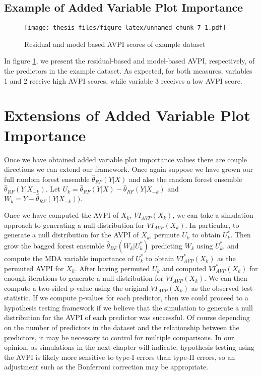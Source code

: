 \documentclass[12pt,twoside]{reedthesis}
\theoremstyle{definition}
\theoremstyle{definition}
\theoremstyle{definition}
\theoremstyle{remark}
\begin{document}
\subsection{Example of Added Variable Plot
Importance}\label{example-of-added-variable-plot-importance}
\begin{figure}
\centering
\texttt{[image: thesis\_files/figure-latex/unnamed-chunk-7-1.pdf]}
\caption{\label{fig:unnamed-chunk-7}\label{AVPIex}Residual and model based
AVPI scores of example dataset}
\end{figure}
In figure \ref{AVPIex}, we present the residual-based and model-based
AVPI, respectively, of the predictors in the example dataset. As
expected, for both measures, variables 1 and 2 receive high AVPI scores,
while variable 3 receives a low AVPI score.

\section{Extensions of Added Variable Plot
Importance}\label{extensions-of-added-variable-plot-importance}

Once we have obtained added variable plot importance values there are
couple directions we can extend our framework. Once again suppose we
have grown our full random forest ensemble \(\hat{\theta}_{RF}(Y|X)\)
and also the random forest ensemble \(\hat{\theta}_{RF}(Y|X_{-k})\). Let
\(U_k=\hat{\theta}_{RF}(Y|X)-\hat{\theta}_{RF}(Y|X_{-k})\) and
\(W_k=Y-\hat{\theta}_{RF}(Y|X_{-k})).\) \par

Once we have computed the AVPI of \(X_k\), \(VI_{AVP}(X_k)\), we can
take a simulation approach to generating a null distribution for
\(VI_{AVP}(X_k)\). In particular, to generate a null distribution for
the AVPI of \(X_k\), permute \(U_k\) to obtain \(U_k^*\). Then grow the
bagged forest ensemble \(\hat{\theta}_{BF}(W_k|U_k^*)\) predicting
\(W_k\) using \(U_k^*\), and compute the MDA variable importance of
\(U_k^*\) to obtain \(VI_{AVP}^*(X_k)\) as the permuted AVPI for
\(X_k\). After having permuted \(U_k\) and computed \(VI_{AVP}^*(X_k)\)
for enough iterations to generate a null distribution for
\(VI_{AVP}(X_k)\). We can then compute a two-sided p-value using the
original \(VI_{AVP}(X_k)\) as the observed test statistic. If we compute
p-values for each predictor, then we could proceed to a hypothesis
testing framework if we believe that the simulation to generate a null
distribution for the AVPI of each predictor was successful. Of course
depending on the number of predictors in the dataset and the
relationship between the predictors, it may be necessary to control for
multiple comparisons. In our opinion, as simulations in the next chapter
will indicate, hypothesis testing using the AVPI is likely more
sensitive to type-I errors than type-II errors, so an adjustment such as
the Bonferroni correction may be appropriate. \par
\end{document}
